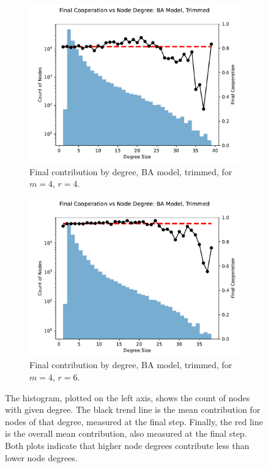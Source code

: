 \FloatBarrier 
\begin{figure}[!h]
  \begin{subfigure}[b]{0.45\textwidth}
    \includegraphics[width=1.1\textwidth]{images/Rep_BA_node_groups_m_4_phi_4_trimmed.pdf}
    \caption{Final contribution by degree, BA model, trimmed, for $m=4$, $r=4$.   }
    \label{by_degree_m_4_phi_4}
  \end{subfigure}
  \hfill
  \begin{subfigure}[b]{0.45\textwidth}
    \includegraphics[width=1.1\textwidth]{images/Rep_BA_node_groups_m_4_phi_6_trimmed.pdf}
    \caption{Final contribution by degree, BA model, trimmed, for $m=4$, $r=6$. }
    \label{by_degree_m_4_phi_6}
  \end{subfigure}
  \caption{The histogram, plotted on the left axis, shows the count of nodes with given degree. The black trend line is the mean contribution for nodes of that degree, measured at the final step. Finally, the red line is the overall mean contribution, also measured at the final step. Both plots indicate that higher node degrees contribute less than lower node degrees.} \label{by_degree_m_4}
\end{figure} 
\FloatBarrier

